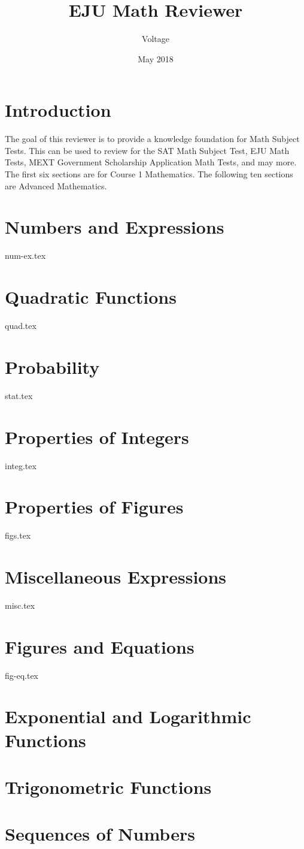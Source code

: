 \documentclass{mext-rev}
\title{EJU Math Reviewer}
\author{Voltage}
\date{May 2018}
\newcommand{\importref}[1]{\label{#1}{#1.tex}}
\begin{document}
\section*{Introduction}
The goal of this reviewer is to provide a knowledge foundation for Math Subject Tests.
This can be used to review for the SAT Math Subject Test, EJU Math Tests, MEXT Government Scholarship Application Math Tests, and may more.
The first six sections are for Course 1 Mathematics.
The following ten sections are Advanced Mathematics.

\section{Numbers and Expressions}\importref{num-ex}
\section{Quadratic Functions}\importref{quad}
\section{Probability}\importref{stat}
\section{Properties of Integers}\importref{integ}
\section{Properties of Figures}\importref{figs}
\section{Miscellaneous Expressions}\importref{misc}
\section{Figures and Equations}\importref{fig-eq}
\section{Exponential and Logarithmic Functions}\label{expo-log}\lipsum[2]
\section{Trigonometric Functions}\label{trig}\lipsum[2]
\section{Sequences of Numbers}\label{seq}\lipsum[2]
\end{document}
